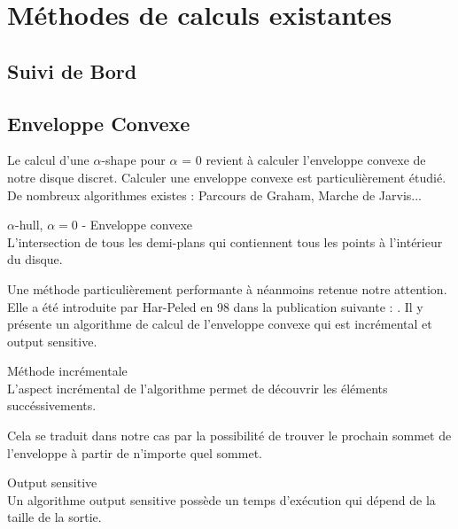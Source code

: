 \section{Méthodes de calculs existantes}

\subsection{Suivi de Bord}

\subsection{Enveloppe Convexe}

Le calcul d'une $\alpha$-shape pour $\alpha$ = 0 revient à calculer l'enveloppe convexe de notre disque discret. Calculer une enveloppe convexe est particulièrement étudié. De nombreux algorithmes existes : Parcours de Graham, Marche de Jarvis... 

\begin{Definition}{$\alpha$-hull, $\alpha = 0$ - Enveloppe convexe}\\
\label{def:ch}
      L'intersection de tous les demi-plans qui contiennent tous les points à l’intérieur du disque.
\end{Definition}

Une méthode particulièrement performante à néanmoins retenue notre attention. Elle a été introduite par Har-Peled en 98 dans la publication suivante : \cite{HarPeled98}. Il y présente un algorithme de calcul de l'enveloppe convexe qui est incrémental et output sensitive.

\begin{Definition}{Méthode incrémentale}\\
\label{def:os}
      L'aspect incrémental de l'algorithme permet de découvrir les éléments succéssivements. 
\end{Definition}
Cela se traduit dans notre cas par la possibilité de trouver le prochain sommet de l'enveloppe à partir de n'importe quel sommet.  

\begin{Definition}{Output sensitive}\\
\label{def:os}
      Un algorithme output sensitive possède un temps d’exécution qui dépend de la taille de la sortie.
\end{Definition}

